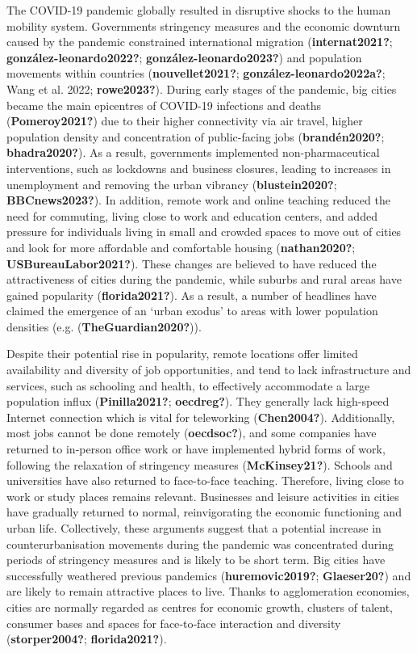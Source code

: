 \documentclass[11pt,letterpaper]{article}
\begin{document}
The COVID-19 pandemic globally resulted in disruptive shocks to the
human mobility system. Governments stringency measures and the economic
downturn caused by the pandemic constrained international migration
(\textbf{internat2021?}; \textbf{gonzález-leonardo2022?};
\textbf{gonzález-leonardo2023?}) and population movements within
countries (\textbf{nouvellet2021?}; \textbf{gonzález-leonardo2022a?};
Wang et al. 2022; \textbf{rowe2023?}). During early stages of the
pandemic, big cities became the main epicentres of COVID-19 infections
and deaths (\textbf{Pomeroy2021?}) due to their higher connectivity via
air travel, higher population density and concentration of public-facing
jobs (\textbf{brandén2020?}; \textbf{bhadra2020?}). As a result,
governments implemented non-pharmaceutical interventions, such as
lockdowns and business closures, leading to increases in unemployment
and removing the urban vibrancy (\textbf{blustein2020?};
\textbf{BBCnews2023?}). In addition, remote work and online teaching
reduced the need for commuting, living close to work and education
centers, and added pressure for individuals living in small and crowded
spaces to move out of cities and look for more affordable and
comfortable housing (\textbf{nathan2020?}; \textbf{USBureauLabor2021?}).
These changes are believed to have reduced the attractiveness of cities
during the pandemic, while suburbs and rural areas have gained
popularity (\textbf{florida2021?}). As a result, a number of headlines
have claimed the emergence of an `urban exodus' to areas with lower
population densities (e.g. (\textbf{TheGuardian2020?})).

Despite their potential rise in popularity, remote locations offer
limited availability and diversity of job opportunities, and tend to
lack infrastructure and services, such as schooling and health, to
effectively accommodate a large population influx
(\textbf{Pinilla2021?}; \textbf{oecdreg?}). They generally lack
high-speed Internet connection which is vital for teleworking
(\textbf{Chen2004?}). Additionally, most jobs cannot be done remotely
(\textbf{oecdsoc?}), and some companies have returned to in-person
office work or have implemented hybrid forms of work, following the
relaxation of stringency measures (\textbf{McKinsey21?}). Schools and
universities have also returned to face-to-face teaching. Therefore,
living close to work or study places remains relevant. Businesses and
leisure activities in cities have gradually returned to normal,
reinvigorating the economic functioning and urban life. Collectively,
these arguments suggest that a potential increase in counterurbanisation
movements during the pandemic was concentrated during periods of
stringency measures and is likely to be short term. Big cities have
successfully weathered previous pandemics (\textbf{huremovic2019?};
\textbf{Glaeser20?}) and are likely to remain attractive places to live.
Thanks to agglomeration economies, cities are normally regarded as
centres for economic growth, clusters of talent, consumer bases and
spaces for face‐to‐face interaction and diversity
(\textbf{storper2004?}; \textbf{florida2021?}).
\end{document}
